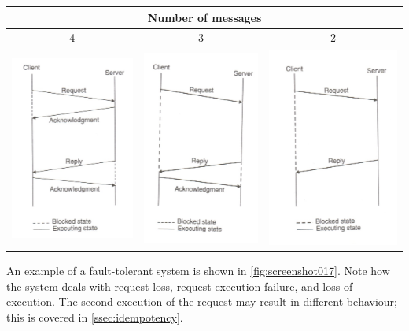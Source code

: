 \begin{tabular}{|c|c|c|}
\hline 
\multicolumn{3}{|c|}{Number of messages}  \\ 
\hline 
4 & 3 & 2 \\ 
\hline 
\includegraphics[width=0.3\linewidth, trim=0 0 0 -5]{figures/screenshot014}
 & 
\includegraphics[width=0.3\linewidth, trim=0 0 0 -5]{figures/screenshot015}
 & 
\includegraphics[width=0.3\linewidth, trim=0 0 0 -5]{figures/screenshot016}
  \\ 
\hline 
\end{tabular} 

An example of a fault-tolerant system is shown in \autoref{fig:screenshot017}. Note how the system deals with request loss, request execution failure, and loss of execution. The second execution of the request may result in different behaviour; this is covered in \autoref{ssec:idempotency}.

